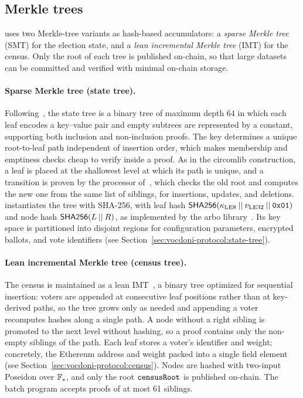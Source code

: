 \subsection{Merkle trees}
\label{sec:cryptographic-primitives:merkle-trees}

\davinci uses two Merkle-tree variants as hash-based accumulators: a \emph{sparse Merkle tree} (SMT) for the election state, and a \emph{lean incremental Merkle tree} (IMT) for the census. Only the root of each tree is published on-chain, so that large datasets can be committed and verified with minimal on-chain storage.

\paragraph{Sparse Merkle tree (state tree).} Following~\cite{baylina2019sparse}, the state tree is a binary tree of maximum depth $64$ in which each leaf encodes a key--value pair and empty subtrees are represented by a constant, supporting both inclusion and non-inclusion proofs. The key determines a unique root-to-leaf path independent of insertion order, which makes membership and emptiness checks cheap to verify inside a proof. As in the circomlib construction, a leaf is placed at the shallowest level at which its path is unique, and a transition is proven by the processor of~\cite{baylina2019sparse}, which checks the old root and computes the new one from the same list of siblings, for insertions, updates, and deletions. \davinci instantiates the tree with SHA-256, with leaf hash ${\sf{SHA256}}(\kappa_{\text{LE8}} \:||\: v_{\text{LE32}} \:||\: \texttt{0x01})$ and node hash ${\sf{SHA256}}(L \:||\: R)$, as implemented by the arbo library~\cite{arbo}. Its key space is partitioned into disjoint regions for configuration parameters, encrypted ballots, and vote identifiers (see Section~\ref{sec:vocdoni-protocol:state-tree}).

\paragraph{Lean incremental Merkle tree (census tree).} The census is maintained as a lean \ac{IMT}~\cite{leanimt}, a binary tree optimized for sequential insertion: voters are appended at consecutive leaf positions rather than at key-derived paths, so the tree grows only as needed and appending a voter recomputes hashes along a single path. A node without a right sibling is promoted to the next level without hashing, so a proof contains only the non-empty siblings of the path. Each leaf stores a voter's identifier and weight; concretely, the Ethereum address and weight packed into a single field element (see Section~\ref{sec:vocdoni-protocol:census}). Nodes are hashed with two-input Poseidon over $\mathbb{F}_s$, and only the root $\texttt{censusRoot}$ is published on-chain. The batch program accepts proofs of at most 61 siblings.

